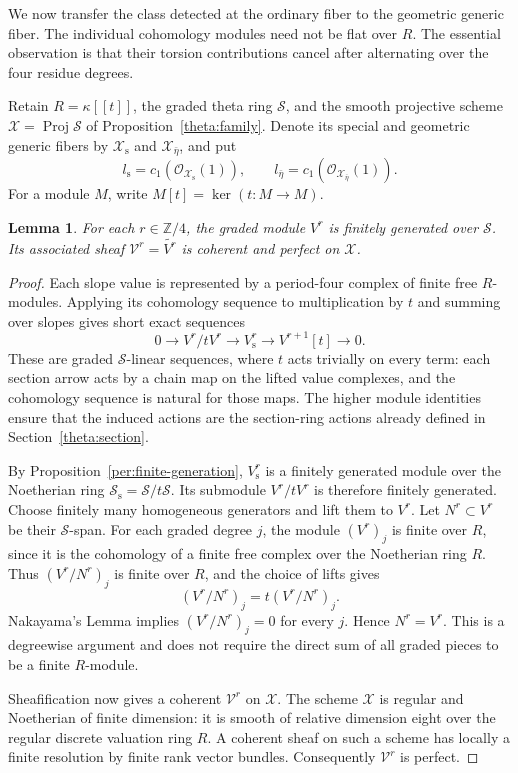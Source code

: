 \documentclass[11pt]{article}
\newtheorem{lemma}[theorem]{Lemma}
\theoremstyle{definition}
\theoremstyle{remark}
\newcommand{\Z}{\mathbb Z}
\DeclareMathOperator{\Proj}{Proj}
\newcommand{\cO}{\mathcal O}
\numberwithin{equation}{section}
\begin{document}
We now transfer the class detected at the ordinary fiber to the geometric
generic fiber.  The individual cohomology modules need not be flat over
$R$.  The essential observation is that their torsion contributions
cancel after alternating over the four residue degrees.

Retain $R=\kappa[[t]]$, the graded theta ring $\mathscr S$, and the smooth
projective scheme $\mathscr X=\Proj\mathscr S$ of
Proposition~\ref{theta:family}.  Denote its special and geometric generic
fibers by $\mathscr X_{\mathrm s}$ and $\mathscr X_{\bar\eta}$,
and put
\[
 l_{\mathrm s}=c_1(\cO_{\mathscr X_{\mathrm s}}(1)),\qquad
 l_{\bar\eta}=c_1(\cO_{\mathscr X_{\bar\eta}}(1)).
\]
For a module $M$, write $M[t]=\ker(t:M\to M)$.

\begin{lemma}
\label{lift:finite-generation}
For each $r\in\Z/4$, the graded module $V^r$ is finitely generated over
$\mathscr S$.  Its associated sheaf $\mathcal V^r=\widetilde{V^r}$ is
coherent and perfect on $\mathscr X$.
\end{lemma}

\begin{proof}
Each slope value is represented by a period-four complex of finite free
$R$-modules.  Applying its cohomology sequence to multiplication by $t$
and summing over slopes gives short exact sequences
\begin{equation}
 0\longrightarrow V^r/tV^r\longrightarrow V_{\mathrm s}^r
  \longrightarrow V^{r+1}[t]\longrightarrow0.
 \label{lift:cohomology-sequence}
\end{equation}
These are graded $\mathscr S$-linear sequences, where $t$ acts trivially
on every term: each section arrow acts by a chain map on the lifted
value complexes, and the cohomology sequence is natural for those maps.
The higher module identities ensure that the induced actions are the
section-ring actions already defined in Section~\ref{theta:section}.

By Proposition~\ref{per:finite-generation}, $V_{\mathrm s}^r$ is a
finitely generated module over the Noetherian ring
$\mathscr S_{\mathrm s}=\mathscr S/t\mathscr S$.
Its submodule $V^r/tV^r$ is therefore finitely generated.  Choose finitely
many homogeneous generators and lift them to $V^r$.  Let $N^r\subset V^r$
be their $\mathscr S$-span.  For each graded degree $j$, the module
$(V^r)_j$ is finite over $R$, since it is the cohomology of a finite
free complex over the Noetherian ring $R$.  Thus $(V^r/N^r)_j$ is finite
over $R$, and the choice of lifts gives
\[
 (V^r/N^r)_j=t(V^r/N^r)_j.
\]
Nakayama's Lemma implies $(V^r/N^r)_j=0$ for every $j$.  Hence $N^r=V^r$.
This is a degreewise argument and does not require the direct sum of all
graded pieces to be a finite $R$-module.

Sheafification now gives a coherent $\mathcal V^r$ on $\mathscr X$.
The scheme $\mathscr X$ is regular and Noetherian of finite dimension:
it is smooth of relative dimension eight over the regular discrete
valuation ring $R$.  A coherent sheaf on such a scheme has locally a
finite resolution by finite rank vector bundles.  Consequently
$\mathcal V^r$ is perfect.
\end{proof}
\end{document}
